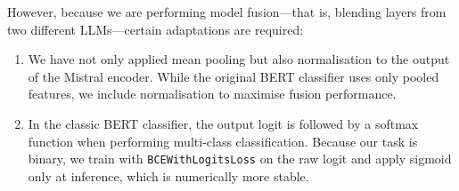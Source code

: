 \documentclass[12pt]{article}
\begin{document}
However, because we are performing model fusion\;---\;that is, blending layers from two different LLMs\;---\;certain adaptations are required:

\begin{enumerate}
  \item We have not only applied mean pooling but also normalisation to the output of the Mistral encoder. 
  While the original BERT classifier uses only pooled features, we include normalisation to maximise fusion performance.
  \item In the classic BERT classifier, the output logit is followed by a softmax function when performing multi-class classification. 
  Because our task is binary, we train with \texttt{BCEWithLogitsLoss} on the raw logit and apply sigmoid only at inference, which is numerically more stable.
\end{enumerate}
\end{document}
